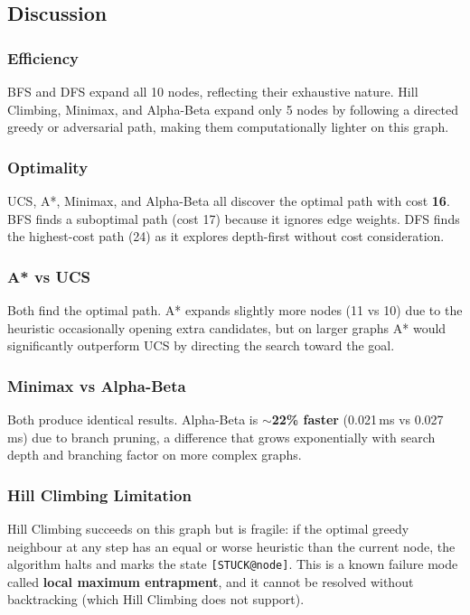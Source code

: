 \documentclass[12pt,a4paper]{article}
\begin{document}
\subsection{Discussion}

\subsubsection{Efficiency}
BFS and DFS expand all 10 nodes, reflecting their exhaustive nature. Hill Climbing,
Minimax, and Alpha-Beta expand only 5 nodes by following a directed greedy or
adversarial path, making them computationally lighter on this graph.

\subsubsection{Optimality}
UCS, A*, Minimax, and Alpha-Beta all discover the optimal path with cost \textbf{16}.
BFS finds a suboptimal path (cost 17) because it ignores edge weights. DFS finds the
highest-cost path (24) as it explores depth-first without cost consideration.

\subsubsection{A* vs UCS}
Both find the optimal path. A* expands slightly more nodes (11 vs 10) due to the
heuristic occasionally opening extra candidates, but on larger graphs A* would
significantly outperform UCS by directing the search toward the goal.

\subsubsection{Minimax vs Alpha-Beta}
Both produce identical results. Alpha-Beta is \textbf{$\sim$22\% faster} (0.021\,ms
vs 0.027\,ms) due to branch pruning, a difference that grows exponentially with search
depth and branching factor on more complex graphs.

\subsubsection{Hill Climbing Limitation}
Hill Climbing succeeds on this graph but is fragile: if the optimal greedy neighbour at
any step has an equal or worse heuristic than the current node, the algorithm halts and
marks the state \texttt{[STUCK@node]}. This is a known failure mode called
\textbf{local maximum entrapment}, and it cannot be resolved without backtracking
(which Hill Climbing does not support).
\end{document}
